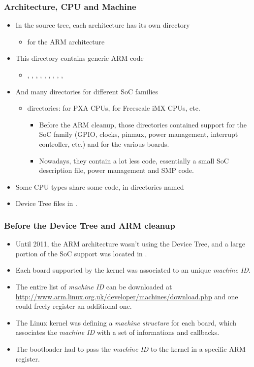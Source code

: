 \begin{frame}
  \frametitle{Architecture, CPU and Machine}
  \begin{itemize}
  \item In the source tree, each architecture has its own directory
    \begin{itemize}
    \item {} for the ARM architecture
    \end{itemize}
  \item This directory contains generic ARM code
    \begin{itemize}
    \item {}, , , ,
      , , , ,
      , 
    \end{itemize}
  \item And many directories for different SoC families
    \begin{itemize}
    \item {} directories:  for PXA CPUs,
       for Freescale iMX CPUs, etc.
      \begin{itemize}
      \item Before the ARM cleanup, those directories contained
        support for the SoC family (GPIO, clocks, pinmux, power
        management, interrupt controller, etc.) and for the various
        boards.
      \item Nowadays, they contain a lot less code, essentially a
        small SoC description file, power management and SMP code.
      \end{itemize}
    \end{itemize}
  \item Some CPU types share some code, in directories named
  \item Device Tree files in .
  \end{itemize}
\end{frame}

\begin{frame}
  \frametitle{Before the Device Tree and ARM cleanup}
  \begin{itemize}
  \item Until 2011, the ARM architecture wasn't using the Device Tree,
    and a large portion of the SoC support was located in
    .
  \item Each board supported by the kernel was associated to an unique
    {\em machine ID}.
  \item The entire list of {\em machine ID} can be downloaded at
    \url{http://www.arm.linux.org.uk/developer/machines/download.php}
    and one could freely register an additional one.
  \item The Linux kernel was defining a {\em machine structure} for
    each board, which associates the {\em machine ID} with a set of
    informations and callbacks.
  \item The bootloader had to pass the {\em machine ID} to the kernel
    in a specific ARM register.
  \end{itemize}
\end{frame}


